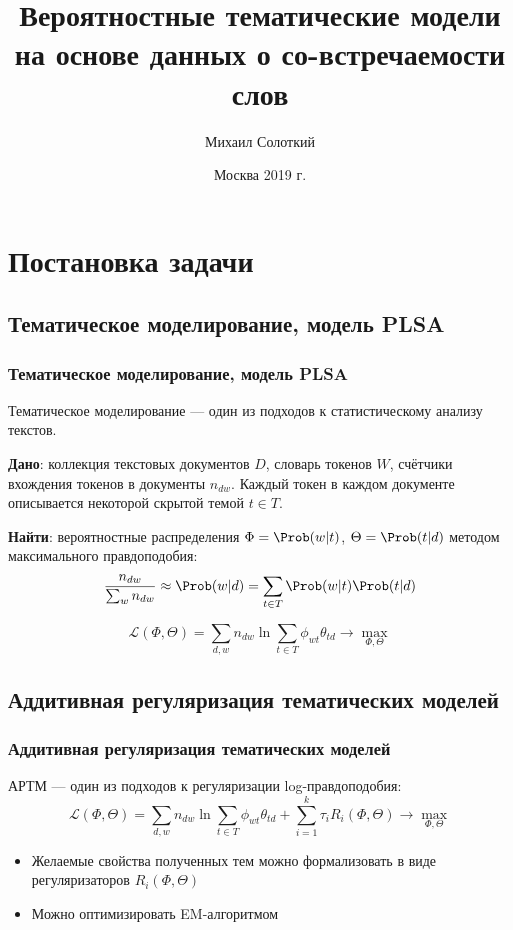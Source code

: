 \documentclass[unicode]{beamer}
\title[]{Вероятностные тематические модели на основе данных о со-встречаемости слов}
\author{Михаил Солоткий}
\institute[ВМК МГУ] %
{
    Московский государственный университет им. М. В. Ломоносова \\
    Факультет вычислительной математики и кибернетики \\
    Кафедра математических методов прогнозирования \\
    \bigskip
    {\bf Выпускная квалификационная работа бакалавра} \\
    \bigskip
    Научный руководитель --- д.ф-м.н. Воронцов К. В.
    \bigskip
}
\date{Москва 2019 г.} %
\begin{document}
\begin{frame}
\titlepage %
\end{frame}


\section{Постановка задачи}

\subsection{Тематическое моделирование, модель PLSA}
\begin{frame}
\frametitle{Тематическое моделирование, модель PLSA}
Тематическое моделирование --- один из подходов к статистическому анализу текстов. \newline

{\bf Дано}: коллекция текстовых документов $D$, словарь токенов $W$, счётчики вхождения токенов в документы $n_{dw}$. Каждый токен в каждом документе описывается некоторой скрытой темой $t \in T$. \newline

{\bf Найти}: вероятностные распределения $\Phi = \Prob(w | t)$, $\Theta = \Prob(t | d)$ методом максимального правдоподобия:
$$\frac{n_{dw}}{\sum_w n_{dw}} \approx \Prob(w | d) = \sum_{t \in T} \Prob(w | t) \Prob(t | d)$$

$$\mathcal{L}(\Phi, \Theta) = \sum_{d, w} n_{dw} \ln \sum_{t \in T} \phi_{wt} \theta_{td} \rightarrow \max_{\Phi, \Theta}$$
\end{frame}


\subsection{Аддитивная регуляризация тематических моделей}
\begin{frame}
\frametitle{Аддитивная регуляризация тематических моделей}
АРТМ --- один из подходов к регуляризации log-правдоподобия:
$$\mathcal{L}(\Phi, \Theta) = \sum_{d, w} n_{dw} \ln \sum_{t \in T} \phi_{wt} \theta_{td} + \sum_{i=1}^k \tau_i R_i(\Phi, \Theta) \rightarrow \max_{\Phi, \Theta}$$
\begin{itemize}
    \item Желаемые свойства полученных тем можно формализовать в виде регуляризаторов $R_i(\Phi, \Theta)$
    \item Можно оптимизировать EM-алгоритмом
\end{itemize}
\end{frame}
\end{document}
